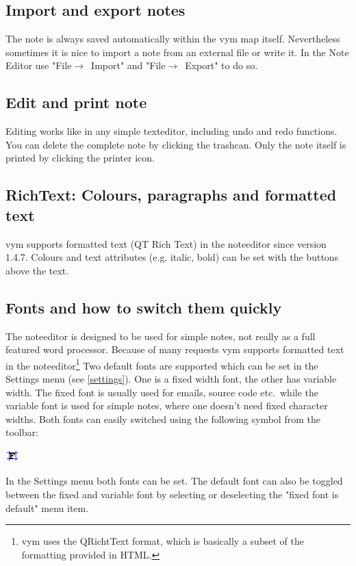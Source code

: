 \documentclass[12pt,a4paper]{article}
\newcommand{\vym}{{\sc vym }}
\newcommand{\ra}{$\longrightarrow$}
\newcommand{\key}[1]{[#1]}
\begin{document}
\subsection{Import and export notes}
The note is always saved automatically within the \vym map itself.
Nevertheless sometimes it is nice to import a note from an external file
or write it. In the Note Editor use "File\ra~Import" and "File\ra~Export" to do so. 

\subsection{Edit and print note}
Editing works like in any simple texteditor, including undo and redo
functions. You can delete the complete note by clicking the
trashcan. Only the note itself is printed by clicking the printer icon.

\subsection{RichText: Colours, paragraphs and formatted text}
\vym supports formatted text (QT Rich Text) in the noteeditor since
version 1.4.7.  Colours and text attributes (e.g. italic, bold) can be
set with the buttons above the text.  

\subsection{Fonts and how to switch them quickly}
The noteeditor is designed to be used for simple notes, not really as a full
featured word processor. Because of many requests \vym supports 
formatted text in the noteeditor\footnote{
    \vym uses the QRichtText format, which is basically a subset of the
    formatting provided in HTML.}
Two default fonts are supported which can be set in the Settings menu
(see \ref{settings}).
One is a fixed width font, the other has variable width. The fixed font
is usually used for emails, source code etc.\ while the variable font is
used for simple notes, where one doesn't need fixed character widths.
Both fonts can easily switched using the following symbol from the
toolbar:
\begin{center}
    \includegraphics[width=0.5cm]{images/formatfixedfont.png}
\end{center}
In the Settings menu both fonts can be set. The default font can also be toggled between the fixed and variable font by selecting or deselecting the "fixed font is default" menu item.
\end{document}
